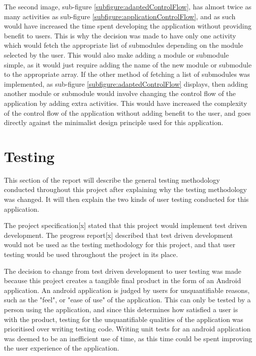 \documentclass{article}
\begin{document}
The second image, sub-figure \ref{subfigure:adaptedControlFlow}, has almost twice as many activities as sub-figure \ref{subfigure:applicationControlFlow}, and as such would have increased the time spent developing the application without providing benefit to users. This is why the decision was made to have only one activity which would fetch the appropriate list of submodules depending on the module selected by the user. This would also make adding a module or submodule simple, as it would just require adding the name of the new module or submodule to the appropriate array. If the other method of fetching a list of submodules was implemented, as sub-figure \ref{subfigure:adaptedControlFlow} displays, then adding another module or submodule would involve changing the control flow of the application by adding extra activities. This would have increased the complexity of the control flow of the application without adding benefit to the user, and goes directly against the minimalist design principle used for this application. 


\section{Testing}
\label{section:testing}

This section of the report will describe the general testing methodology conducted throughout this project after explaining why the testing methodology was changed. It will then explain the two kinds of user testing conducted for this application. 

The project specification[x] stated that this project would implement test driven development. The progress report[x] described that test driven development would not be used as the testing methodology for this project, and that user testing would be used throughout the project in its place. \par

The decision to change from test driven development to user testing was made because this project creates a tangible final product in the form of an Android application. An android application is judged by users for unquantifiable reasons, such as the "feel", or "ease of use" of the application. This can only be tested by a person using the application, and since this determines how satisfied a user is with the product, testing for the unquantifiable qualities of the application was prioritised over writing testing code. Writing unit tests for an android application was deemed to be an inefficient use of time, as this time could be spent improving the user experience of the application. \par
\end{document}
